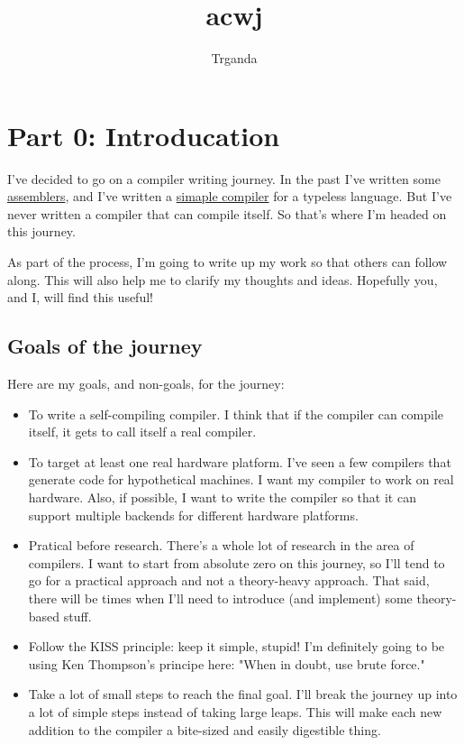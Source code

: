 \documentclass[a4paper,12pt]{article}
\title{acwj}
\author{Trganda}
\begin{document}
\maketitle

\section{Part 0: Introducation}

I've decided to go on a compiler writing journey.
In the past I've written some \href{https://github.com/DoctorWkt/pdp7-unix/blob/master/tools/as7}{assemblers}, 
and I've written a \href{https://github.com/DoctorWkt/h-compiler}{simaple compiler} for a typeless language.
But I've never written a compiler that can compile itself.
So that's where I'm headed on this journey.

As part of the process, I'm going to write up my work so that others can follow along.
This will also help me to clarify my thoughts and ideas. Hopefully you, and I, will find this useful!

\subsection{Goals of the journey}

Here are my goals, and non-goals, for the journey:

\begin{itemize}
    \item To write a self-compiling compiler. I think that if the compiler can compile itself, it gets to call itself a real compiler.
    \item To target at least one real hardware platform. I've seen a few compilers that generate code for hypothetical machines. 
          I want my compiler to work on real hardware. Also, if possible, I want to write the compiler so that it can support multiple backends for different hardware platforms.
    \item Pratical before research. There's a whole lot of research in the area of compilers. I want to start from absolute zero on this journey, so I'll tend to go for a practical approach and not a theory-heavy approach. That said, there will be times when I'll need to introduce (and implement) some theory-based stuff.
    \item Follow the KISS principle: keep it simple, stupid! I'm definitely going to be using Ken Thompson's principe here: "When in doubt, use brute force."
    \item Take a lot of small steps to reach the final goal. I'll break the journey up into a lot of simple steps instead of taking large leaps. This will make each new addition to the compiler a bite-sized and easily digestible thing.
\end{itemize}
\end{document}
